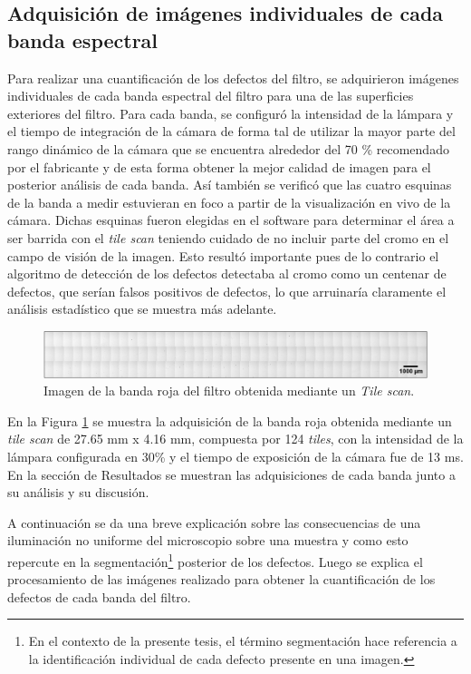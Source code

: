 \singlespacing
\subsection{Adquisición de imágenes individuales de cada banda espectral}

\hspace{0.5cm}Para realizar una cuantificación de los defectos del filtro, se adquirieron imágenes individuales de cada banda espectral del filtro para una de las superficies exteriores del filtro. Para cada banda, se configuró la intensidad de la lámpara y el tiempo de integración de la cámara de forma tal de utilizar la mayor parte del rango dinámico de la cámara que se encuentra alrededor del 70 \% recomendado por el fabricante y de esta forma obtener la mejor calidad de imagen para el posterior análisis de cada banda. Así también se verificó que las cuatro esquinas de la banda a medir estuvieran en foco a partir de la visualización en vivo de la cámara. Dichas esquinas fueron elegidas en el software para determinar el área a ser barrida con el \textit{tile scan} teniendo cuidado de no incluir parte del cromo en el campo de visión de la imagen. Esto resultó importante pues de lo contrario el algoritmo de detección de los defectos detectaba al cromo como un centenar de defectos, que serían falsos positivos de defectos, lo que arruinaría claramente el análisis estadístico que se muestra más adelante.

\begin{figure}[H]
	\centering
	\includegraphics[width=1.0\textwidth]{Figs/defectosZEISS/tilebandaroja.png}
	\caption{Imagen de la banda roja del filtro obtenida mediante un \textit{Tile scan}.}
	\label{fig:tilebandaroja}
\end{figure}

En la Figura \ref{fig:tilebandaroja} se muestra la adquisición de la banda roja obtenida mediante un \textit{tile scan} de 27.65 mm x 4.16 mm, compuesta por 124 \textit{tiles}, con la intensidad de la lámpara configurada en 30\% y el tiempo de exposición de la cámara fue de 13 ms. En la sección de Resultados se muestran las adquisiciones de cada banda junto a su análisis y su discusión.

A continuación se da una breve explicación sobre las consecuencias de una iluminación no uniforme del microscopio sobre una muestra y como esto repercute en la segmentación\footnote{En el contexto de la presente tesis, el término segmentación hace referencia a la identificación individual de cada defecto presente en una imagen.} posterior de los defectos. Luego se explica el procesamiento de las imágenes realizado para obtener la cuantificación de los defectos de cada banda del filtro.

